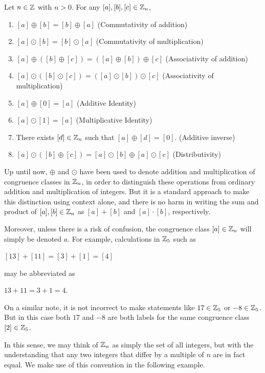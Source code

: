 \documentclass[11pt,fleqn,dvipsnames,usenames]{article}
\newcommand{\p}{\noindent}
\begin{document}
\begin{theorem}  \label{propertiesofZn} Let $n\in\mathbb{Z}$ with $n>0$.  For any $[a], [b], [c]\in\mathbb{Z}_{n}$,
\begin{enumerate}[(1)]
\item $[a] \oplus [b] = [b]\oplus [a]$ \hfill (Commutativity of addition)
\item $[a] \odot [b] = [b]\odot [a]$ \hfill (Commutativity of multiplication)
\item $[a]\oplus ([b]\oplus [c]) = ([a] \oplus [b])\oplus [c]$ \hfill (Associativity of addition)
\item $[a]\odot ([b]\odot [c]) = ([a] \odot [b])\odot [c]$ \hfill (Associativity of multiplication)
\item $[a]\oplus [0] = [a]$ \hfill (Additive Identity)
\item $[a]\odot [1] = [a]$ \hfill (Multiplicative Identity)
\item There exists $[d]\in \mathbb{Z}_{n}$ such that $[a] \oplus [d] = [0]$. \hfill (Additive inverse)
\item $[a]\odot ([b]\oplus [c]) = [a]\odot [b] \oplus [a]\odot [c]$ \hfill (Distributivity)
\end{enumerate}
\end{theorem}
\vsp

%
\p Up until now, $\oplus$ and $\odot$ have been used to denote addition and multiplication of congruence classes in $\mathbb{Z}_{n}$, in order to distinguish these operations from ordinary addition and multiplication of integers.  But it is a standard approach to make this distinction using context alone, and there is no harm in writing the sum and product of $[a],[b]\in \mathbb{Z}_{n}$ as $[a] + [b]$ and $[a]\cdot [b]$, respectively.
\vsp

\p Moreover, unless there is a risk of confusion, the congruence class $[a]\in\mathbb{Z}_{n}$ will simply be denoted $a$.  For example, calculations in $\mathbb{Z}_5$ such as
\begin{center}
$[13] + [11] = [3] + [1] = [4]$
\end{center}
may be abbreviated as
\begin{center}
$13 + 11 = 3 + 1 = 4$.
\end{center}
On a similar note, it is not incorrect to make statements like $17\in\mathbb{Z}_5$ or $-8\in\mathbb{Z}_5$.  But in this case both $17$ and $-8$ are both labels for the same congruence class $[2]\in\mathbb{Z}_5$.
\vsp

\p In this sense, we may think of $\mathbb{Z}_{n}$ as simply the set of all integers, but with the understanding that any two integers that differ by a multiple of $n$ are in fact equal.  We make use of this convention in the following example.
\vsp
\end{document}
